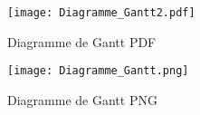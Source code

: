 \documentclass[11pt]{report}
\begin{document}
\begin{landscape}



 \pagestyle{empty} 

 \begin{figure}[h!]
  \caption{Diagramme de Gantt PDF}
  \hspace{-4cm}
    \texttt{[image: Diagramme\_Gantt2.pdf]}
\end{figure}
 
  \begin{figure}[h!]
 
  
  
  \caption{Diagramme de Gantt PNG}
   \hspace{-5cm}
    \texttt{[image: Diagramme\_Gantt.png]}
\end{figure}

 \end{landscape}
\end{document}
